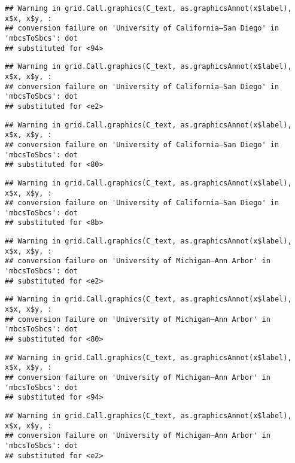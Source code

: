 \documentclass[]{article}
\begin{document}
\begin{verbatim}
## Warning in grid.Call.graphics(C_text, as.graphicsAnnot(x$label), x$x, x$y, :
## conversion failure on 'University of California—​San Diego' in 'mbcsToSbcs': dot
## substituted for <94>
\end{verbatim}

\begin{verbatim}
## Warning in grid.Call.graphics(C_text, as.graphicsAnnot(x$label), x$x, x$y, :
## conversion failure on 'University of California—​San Diego' in 'mbcsToSbcs': dot
## substituted for <e2>
\end{verbatim}

\begin{verbatim}
## Warning in grid.Call.graphics(C_text, as.graphicsAnnot(x$label), x$x, x$y, :
## conversion failure on 'University of California—​San Diego' in 'mbcsToSbcs': dot
## substituted for <80>
\end{verbatim}

\begin{verbatim}
## Warning in grid.Call.graphics(C_text, as.graphicsAnnot(x$label), x$x, x$y, :
## conversion failure on 'University of California—​San Diego' in 'mbcsToSbcs': dot
## substituted for <8b>
\end{verbatim}

\begin{verbatim}
## Warning in grid.Call.graphics(C_text, as.graphicsAnnot(x$label), x$x, x$y, :
## conversion failure on 'University of Michigan—​Ann Arbor' in 'mbcsToSbcs': dot
## substituted for <e2>
\end{verbatim}

\begin{verbatim}
## Warning in grid.Call.graphics(C_text, as.graphicsAnnot(x$label), x$x, x$y, :
## conversion failure on 'University of Michigan—​Ann Arbor' in 'mbcsToSbcs': dot
## substituted for <80>
\end{verbatim}

\begin{verbatim}
## Warning in grid.Call.graphics(C_text, as.graphicsAnnot(x$label), x$x, x$y, :
## conversion failure on 'University of Michigan—​Ann Arbor' in 'mbcsToSbcs': dot
## substituted for <94>
\end{verbatim}

\begin{verbatim}
## Warning in grid.Call.graphics(C_text, as.graphicsAnnot(x$label), x$x, x$y, :
## conversion failure on 'University of Michigan—​Ann Arbor' in 'mbcsToSbcs': dot
## substituted for <e2>
\end{verbatim}
\end{document}
